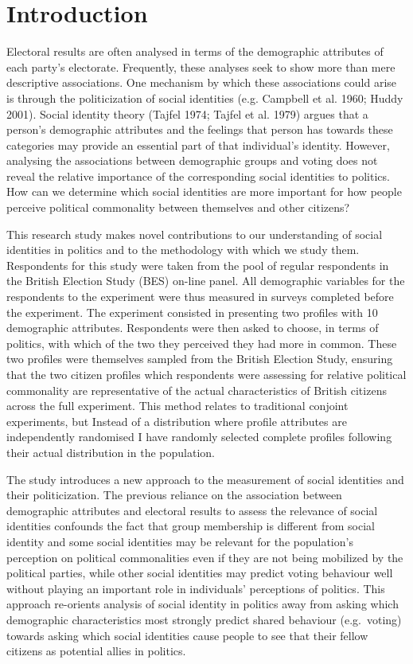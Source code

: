\documentclass[a4paper]{cupjournal}
\begin{document}
\vskip 6.5pt

\noindent \doublespacing \hypertarget{introduction}{%
\section{Introduction}\label{introduction}}

Electoral results are often analysed in terms of the demographic attributes of each party's electorate. Frequently, these analyses seek to show more than mere descriptive associations. One mechanism by which these associations could arise is through the politicization of social identities (e.g. Campbell et al. 1960; Huddy 2001). Social identity theory (Tajfel 1974; Tajfel et al. 1979) argues that a person's demographic attributes and the feelings that person has towards these categories may provide an essential part of that individual's identity.
However, analysing the associations between demographic groups and voting does not reveal the relative importance of the corresponding social identities to politics. How can we determine which social identities are more important for how people perceive political commonality between themselves and other citizens?

This research study makes novel contributions to our understanding of social identities in politics and to the methodology with which we study them. Respondents for this study were taken from the pool of regular respondents in the British Election Study (BES) on-line panel. All demographic variables for the respondents to the experiment were thus measured in surveys completed before the experiment. The experiment consisted in presenting two profiles with 10 demographic attributes. Respondents were then asked to choose, in terms of politics, with which of the two they perceived they had more in common. These two profiles were themselves sampled from the British Election Study, ensuring that the two citizen profiles which respondents were assessing for relative political commonality are representative of the actual characteristics of British citizens across the full experiment. This method relates to traditional conjoint experiments, but Instead of a distribution where profile attributes are independently randomised I have randomly selected complete profiles following their actual distribution in the population.

The study introduces a new approach to the measurement of social identities and their politicization. The previous reliance on the association between demographic attributes and electoral results to assess the relevance of social identities confounds the fact that group membership is different from social identity and some social identities may be relevant for the population's perception on political commonalities even if they are not being mobilized by the political parties, while other social identities may predict voting behaviour well without playing an important role in individuals' perceptions of politics. This approach re-orients analysis of social identity in politics away from asking which demographic characteristics most strongly predict shared behaviour (e.g.~voting) towards asking which social identities cause people to see that their fellow citizens as potential allies in politics.
\end{document}
